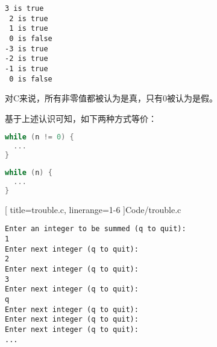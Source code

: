 \begin{frame}[fragile]
  \begin{lstlisting}[backgroundcolor=\color{blue!20}]
 3 is true
 2 is true
 1 is true
 0 is false
-3 is true
-2 is true
-1 is true
 0 is false
\end{lstlisting}    

\end{frame}

\begin{frame}[fragile]

\textcolor{acolor1}{对C来说，所有非零值都被认为是真，只有0被认为是假。}
\end{frame}

\begin{frame}[fragile]
基于上述认识可知，如下两种方式等价：
\begin{minipage}{.45\textwidth}
\begin{lstlisting}[language=c,backgroundcolor=\color{red!10}]
while (n != 0) {
  ...
}
\end{lstlisting}
\end{minipage}\hfill 
\begin{minipage}{.45\textwidth}
\begin{lstlisting}[language=c,backgroundcolor=\color{red!10}]
while (n) {
  ...
}
\end{lstlisting}
\end{minipage}
\end{frame}

\begin{frame}[fragile]

    [
      title=trouble.c,
      linerange={1-6}
    ]{Code/trouble.c}
\end{frame}

\begin{frame}

\end{frame}

\begin{frame}[fragile]
\begin{lstlisting}[backgroundcolor=\color{red!10}]
Enter an integer to be summed (q to quit): 
1
Enter next integer (q to quit): 
2
Enter next integer (q to quit): 
3
Enter next integer (q to quit): 
q
Enter next integer (q to quit): 
Enter next integer (q to quit): 
Enter next integer (q to quit):
... 
\end{lstlisting}
\end{frame}

